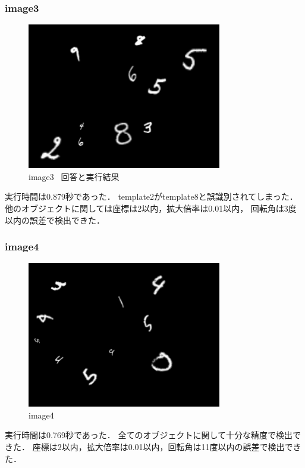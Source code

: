 \documentclass[uplatex,dvipdfmx]{jsarticle}
\begin{document}
\subsubsection{image3}
\begin{figure}[h]
\centering
\includegraphics[clip,width = 8.5cm]{images/image3.png}
\caption{image3~ 回答と実行結果}
\label{graph3}
\end{figure}


\newpage
実行時間は0.879秒であった．
template2がtemplate8と誤識別されてしまった．
他のオブジェクトに関しては座標は2以内，拡大倍率は0.01以内，
回転角は3度以内の誤差で検出できた．


\subsubsection{image4}

\begin{figure}[h]
\centering
\includegraphics[clip,width = 8.5cm]{images/image4.png}
\caption{image4}
\label{graph4}
\end{figure}


\newpage
実行時間は0.769秒であった．
全てのオブジェクトに関して十分な精度で検出できた．
座標は2以内，拡大倍率は0.01以内，回転角は11度以内の誤差で検出できた．
\end{document}
